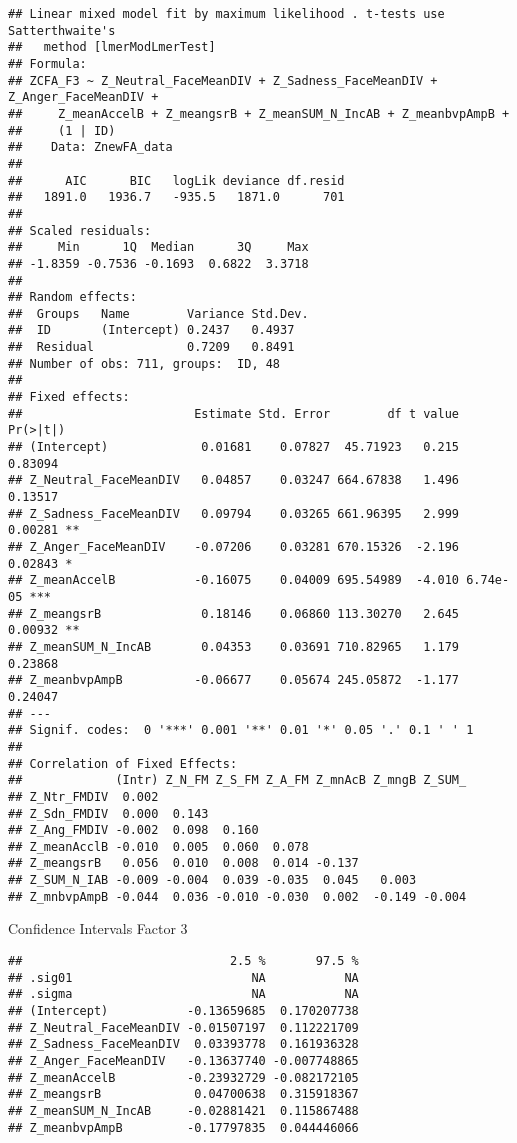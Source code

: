 \documentclass[
]{article}
\begin{document}
\begin{verbatim}
## Linear mixed model fit by maximum likelihood . t-tests use Satterthwaite's
##   method [lmerModLmerTest]
## Formula: 
## ZCFA_F3 ~ Z_Neutral_FaceMeanDIV + Z_Sadness_FaceMeanDIV + Z_Anger_FaceMeanDIV +  
##     Z_meanAccelB + Z_meangsrB + Z_meanSUM_N_IncAB + Z_meanbvpAmpB +  
##     (1 | ID)
##    Data: ZnewFA_data
## 
##      AIC      BIC   logLik deviance df.resid 
##   1891.0   1936.7   -935.5   1871.0      701 
## 
## Scaled residuals: 
##     Min      1Q  Median      3Q     Max 
## -1.8359 -0.7536 -0.1693  0.6822  3.3718 
## 
## Random effects:
##  Groups   Name        Variance Std.Dev.
##  ID       (Intercept) 0.2437   0.4937  
##  Residual             0.7209   0.8491  
## Number of obs: 711, groups:  ID, 48
## 
## Fixed effects:
##                        Estimate Std. Error        df t value Pr(>|t|)    
## (Intercept)             0.01681    0.07827  45.71923   0.215  0.83094    
## Z_Neutral_FaceMeanDIV   0.04857    0.03247 664.67838   1.496  0.13517    
## Z_Sadness_FaceMeanDIV   0.09794    0.03265 661.96395   2.999  0.00281 ** 
## Z_Anger_FaceMeanDIV    -0.07206    0.03281 670.15326  -2.196  0.02843 *  
## Z_meanAccelB           -0.16075    0.04009 695.54989  -4.010 6.74e-05 ***
## Z_meangsrB              0.18146    0.06860 113.30270   2.645  0.00932 ** 
## Z_meanSUM_N_IncAB       0.04353    0.03691 710.82965   1.179  0.23868    
## Z_meanbvpAmpB          -0.06677    0.05674 245.05872  -1.177  0.24047    
## ---
## Signif. codes:  0 '***' 0.001 '**' 0.01 '*' 0.05 '.' 0.1 ' ' 1
## 
## Correlation of Fixed Effects:
##             (Intr) Z_N_FM Z_S_FM Z_A_FM Z_mnAcB Z_mngB Z_SUM_
## Z_Ntr_FMDIV  0.002                                           
## Z_Sdn_FMDIV  0.000  0.143                                    
## Z_Ang_FMDIV -0.002  0.098  0.160                             
## Z_meanAcclB -0.010  0.005  0.060  0.078                      
## Z_meangsrB   0.056  0.010  0.008  0.014 -0.137               
## Z_SUM_N_IAB -0.009 -0.004  0.039 -0.035  0.045   0.003       
## Z_mnbvpAmpB -0.044  0.036 -0.010 -0.030  0.002  -0.149 -0.004
\end{verbatim}

Confidence Intervals Factor 3

\begin{verbatim}
##                             2.5 %       97.5 %
## .sig01                         NA           NA
## .sigma                         NA           NA
## (Intercept)           -0.13659685  0.170207738
## Z_Neutral_FaceMeanDIV -0.01507197  0.112221709
## Z_Sadness_FaceMeanDIV  0.03393778  0.161936328
## Z_Anger_FaceMeanDIV   -0.13637740 -0.007748865
## Z_meanAccelB          -0.23932729 -0.082172105
## Z_meangsrB             0.04700638  0.315918367
## Z_meanSUM_N_IncAB     -0.02881421  0.115867488
## Z_meanbvpAmpB         -0.17797835  0.044446066
\end{verbatim}
\end{document}
